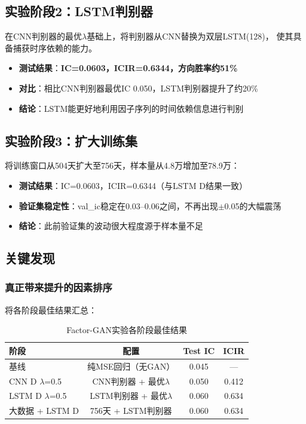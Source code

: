 \documentclass[12pt,a4paper]{ctexart}
\begin{document}
\subsection{实验阶段2：LSTM判别器}

在CNN判别器的最优$\lambda$基础上，将判别器从CNN替换为双层LSTM(128)，
使其具备捕获时序依赖的能力。

\begin{itemize}[leftmargin=*]
    \item \textbf{测试结果}：\textbf{IC=0.0603，ICIR=0.6344，方向胜率约51\%}
    \item \textbf{对比}：相比CNN判别器最优IC 0.050，LSTM判别器提升了约20\%
    \item \textbf{结论}：LSTM能更好地利用因子序列的时间依赖信息进行判别
\end{itemize}

\subsection{实验阶段3：扩大训练集}

将训练窗口从504天扩大至756天，样本量从4.8万增加至78.9万：

\begin{itemize}[leftmargin=*]
    \item \textbf{测试结果}：IC=0.0603，ICIR=0.6344（与LSTM D结果一致）
    \item \textbf{验证集稳定性}：val\_ic稳定在0.03--0.06之间，不再出现$\pm$0.05的大幅震荡
    \item \textbf{结论}：此前验证集的波动很大程度源于样本量不足
\end{itemize}

\subsection{关键发现}

\subsubsection{真正带来提升的因素排序}

将各阶段最佳结果汇总：

\begin{table}[htbp]
\centering
\caption{Factor-GAN实验各阶段最佳结果}
\label{tab:gan_progress}
\begin{tabular}{lccc}
\toprule
阶段 & 配置 & Test IC & ICIR \\
\midrule
基线 & 纯MSE回归（无GAN） & 0.045 & --- \\
CNN D $\lambda$=0.5 & CNN判别器 + 最优$\lambda$ & 0.050 & 0.412 \\
LSTM D $\lambda$=0.5 & LSTM判别器 + 最优$\lambda$ & 0.060 & 0.634 \\
大数据 + LSTM D & 756天 + LSTM判别器 & 0.060 & 0.634 \\
\bottomrule
\end{tabular}
\end{table}
\end{document}
